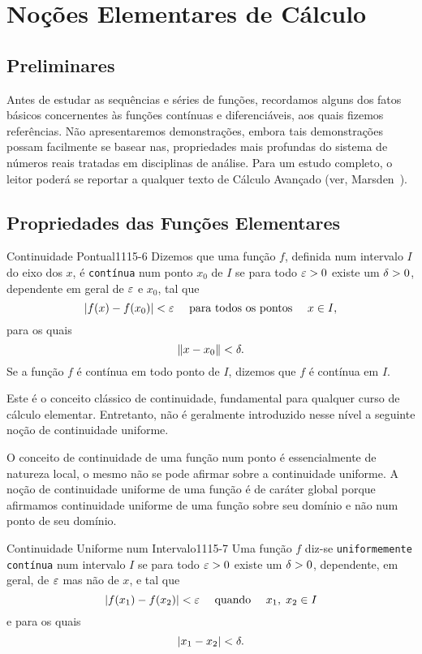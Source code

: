%
\chapter{Noções Elementares de Cálculo}
\section{Preliminares}
Antes de estudar as sequências e séries de funções, recordamos alguns dos fatos básicos concernentes às funções contínuas e diferenciáveis, aos quais fizemos 
referências. Não apresentaremos demonstrações, embora tais demonstrações possam facilmente se basear nas, propriedades mais profundas do sistema de números reais 
tratadas em disciplinas de análise. Para um estudo completo, o leitor poderá se reportar a qualquer texto de Cálculo Avançado (ver, Marsden~\cite{mars}).

\section{Propriedades das Funções Elementares}
\begin{defic}{Continuidade Pontual}{1115-6}
Dizemos que uma função $f$, definida num intervalo $I$ do eixo dos $x$, é \texttt{contínua} num ponto $x_{0}$ de $I$ se para todo $\varepsilon > 0$ existe um $\delta > 0$, dependente em geral 
de $\varepsilon$ e $x_{0}$, tal que
\begin{equation*}
|f(x)-f(x_{0})| <\varepsilon \quad \text{ para todos os pontos } \quad x \in I,
\end{equation*}
para os quais
\begin{equation*}
\|x-x_{0}\| <\delta.
\end{equation*}
Se a função $f$ é contínua em todo ponto de $I$, dizemos que $f$ é contínua em $I$.
\end{defic}


Este é o conceito clássico de continuidade, fundamental para qualquer curso de cálculo elementar. Entretanto, não é geralmente introduzido nesse nível a seguinte noção de continuidade uniforme.

O conceito de continuidade de uma função num ponto é essencialmente de natureza local, o mesmo não se pode afirmar sobre a continuidade uniforme. A noção de continuidade uniforme de uma função é de caráter global porque afirmamos continuidade uniforme de uma função sobre seu domínio e não num ponto de seu domínio.

\begin{defic}{Continuidade Uniforme num Intervalo}{1115-7}
Uma função $f$ diz-se \texttt{uniformemente contínua} num intervalo $I$ se para todo $\varepsilon > 0$ existe um $\delta > 0$, dependente, em geral, de $\varepsilon$  mas não de $x$, e tal que
\begin{equation*}
|f(x_1)-f(x_2)| < \varepsilon \quad \text{ quando } \quad x_1, \;  x_2 \in I
\end{equation*}
e para os quais
\begin{equation*}
|x_1- x_2| < \delta.
\end{equation*}
\end{defic}

